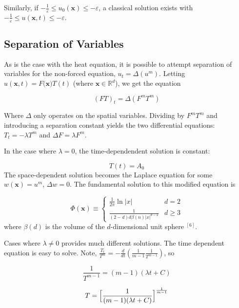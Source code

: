 \documentclass[paper=a4, fontsize=12pt]{scrartcl} %
\numberwithin{equation}{section} %
\numberwithin{table}{section} %
\begin{document}
Similarly, if $-\frac{1}{\varepsilon} \le u_0(\mathbf{x}) \le - \varepsilon$, a classical solution exists with $-\frac{1}{\varepsilon} \le u(\mathbf{x},t) \le - \varepsilon$.



\subsection{Separation of Variables}
As is the case with the heat equation, it is possible to attempt separation of variables for the non-forced equation, $u_t = \Delta (u^m)$. Letting $u(\mathbf{x},t) = F(\mathbf{x)}T(t)$ (where $\mathbf{x} \in \mathbb{R}^d$), we get the equation

\begin{equation}
    (FT)_t = \Delta(F^mT^m)
\end{equation}

Where $\Delta$ only operates on the spatial variables. Dividing by $F^mT^m$ and introducing a separation constant yields the two differential equations: $T_t = -\lambda T^m$ and $\Delta F = \lambda F^m$.

In the case where $\lambda = 0$, the time-dependendent solution is constant:

\begin{equation}
    T(t)=A_0
\end{equation} The space-dependent solution becomes the Laplace equation for some $w(\mathbf{x})= u^m$, $\Delta w = 0$. The fundamental solution to this modified equation is

\begin{equation}
    \Phi (\mathbf{x}) \equiv \begin{cases}
        \frac{1}{2 \pi} \ln |x| & d = 2 \\
        \frac{1}{(2-d)d \beta(n) |x|^{d-2}} & d \ge 3
    \end{cases}
\end{equation} 
where $\beta(d)$ is the volume of the $d$-dimensional unit sphere $^{[6]}$. 

Cases where $\lambda \ne 0$ provides much different solutions. The time dependent equation is easy to solve. Note, $\frac{T_t}{T^m}= -\frac{d}{d t}(\frac{1}{m-1}\frac{1}{T^{m-1}})$, so

$$\frac{1}{T^{m-1}}= (m-1)(\lambda t+C)$$


\begin{equation}
    T= \Big{[} \frac{1}{(m-1)(\lambda t+C)}\Big{]}^\frac{1}{m-1}
\end{equation}
\end{document}
